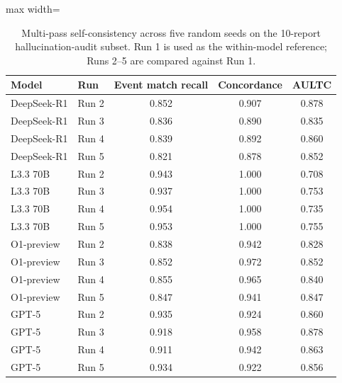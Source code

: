 \begin{table}[htbp]
\ChSixUseRaggedCaption
\caption{Multi-pass self-consistency across five random seeds on the 10-report hallucination-audit subset. Run 1 is used as the within-model reference; Runs 2--5 are compared against Run 1.}
\ChSixTableBodyStart
\begin{ChSixFloatBody}

\centering
\small


\begin{adjustbox}{max width=\textwidth}
\begin{tabular}{llccc}
\toprule
Model & Run & Event match recall & Concordance & AULTC \\
\midrule
DeepSeek-R1 & Run 2 & 0.852 & 0.907 & 0.878 \\
DeepSeek-R1 & Run 3 & 0.836 & 0.890 & 0.835 \\
DeepSeek-R1 & Run 4 & 0.839 & 0.892 & 0.860 \\
DeepSeek-R1 & Run 5 & 0.821 & 0.878 & 0.852 \\
\midrule
L3.3 70B & Run 2 & 0.943 & 1.000 & 0.708 \\
L3.3 70B & Run 3 & 0.937 & 1.000 & 0.753 \\
L3.3 70B & Run 4 & 0.954 & 1.000 & 0.735 \\
L3.3 70B & Run 5 & 0.953 & 1.000 & 0.755 \\
\midrule
O1-preview & Run 2 & 0.838 & 0.942 & 0.828 \\
O1-preview & Run 3 & 0.852 & 0.972 & 0.852 \\
O1-preview & Run 4 & 0.855 & 0.965 & 0.840 \\
O1-preview & Run 5 & 0.847 & 0.941 & 0.847 \\
\midrule
GPT-5 & Run 2 & 0.935 & 0.924 & 0.860 \\
GPT-5 & Run 3 & 0.918 & 0.958 & 0.878 \\
GPT-5 & Run 4 & 0.911 & 0.942 & 0.863 \\
GPT-5 & Run 5 & 0.934 & 0.922 & 0.856 \\
\bottomrule
\end{tabular}
\end{adjustbox}

\end{ChSixFloatBody}
\end{table}
